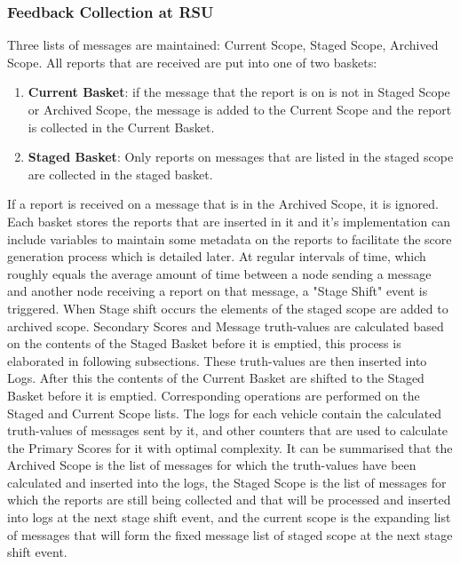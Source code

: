 \documentclass[journal]{IEEEtran}
\begin{document}
\subsubsection{Feedback Collection at RSU}
Three lists of messages are maintained: Current Scope, Staged Scope, Archived Scope.
All reports that are received are put into one of two baskets:
\begin{enumerate}
	\item \textbf{Current Basket}: if the message that the report is on is not in Staged Scope or Archived Scope, the message is added to the Current Scope and the report is collected in the Current Basket.
	\item \textbf{Staged Basket}: Only reports on messages that are listed in the staged scope are collected in the staged basket.
\end{enumerate}
If a report is received on a message that is in the Archived Scope, it is ignored. Each basket stores the reports that are inserted in it and it's implementation can include variables to maintain some metadata on the reports to facilitate the score generation process which is detailed later. At regular intervals of time, which roughly equals the average amount of time between a node sending a message and another node receiving a report on that message, a "Stage Shift" event is triggered. When Stage shift occurs the elements of the staged scope are added to archived scope. Secondary Scores and Message truth-values are calculated based on the contents of the Staged Basket before it is emptied, this process is elaborated in following subsections. These truth-values are then inserted into Logs. After this the contents of the Current Basket are shifted to the Staged Basket before it is emptied. Corresponding operations are performed on the Staged and Current Scope lists. 
The logs for each vehicle contain the calculated truth-values of messages sent by it, and other counters that are used to calculate the Primary Scores for it with optimal complexity.
It can be summarised that the Archived Scope is the list of messages for which the truth-values have been calculated and inserted into the logs, the Staged Scope is the list of messages for which the reports are still being collected and that will be processed and inserted into logs at the next stage shift event, and the current scope is the expanding list of messages that will form the fixed message list of staged scope at the next stage shift event.
\end{document}
